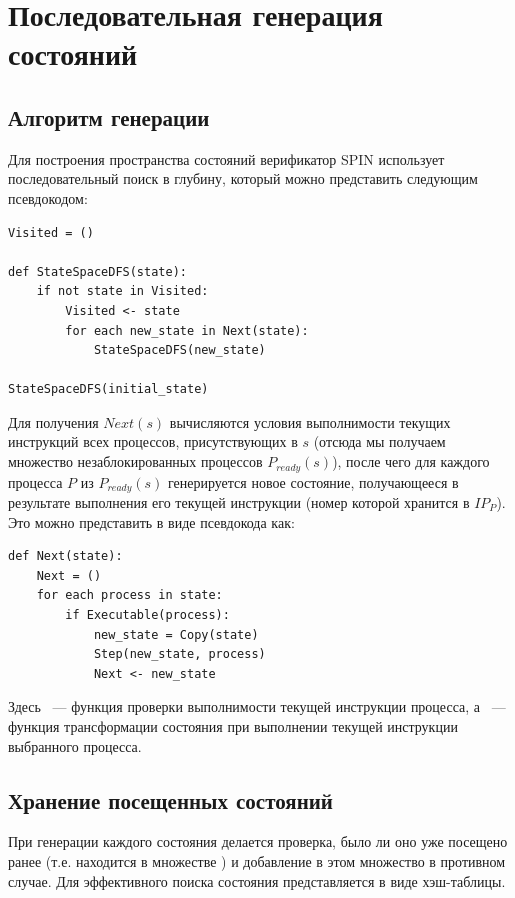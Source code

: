 \chapter{Последовательная генерация состояний}
\label{sec:seq-statespace}

\section{Алгоритм генерации}
\label{sec:seq-algo}

Для построения пространства состояний верификатор SPIN использует последовательный поиск в
глубину, который можно представить следующим псевдокодом:

\begin{lstlisting}[style=pseudocode]
Visited = ()

def StateSpaceDFS(state):
    if not state in Visited:
        Visited <- state
        for each new_state in Next(state):
            StateSpaceDFS(new_state)

StateSpaceDFS(initial_state)
\end{lstlisting}

Для получения $Next(s)$ вычисляются условия выполнимости текущих инструкций всех
процессов, присутствующих в $s$ (отсюда мы получаем множество незаблокированных процессов
$P_{ready}(s)$), после чего для каждого процесса $P$ из $P_{ready}(s)$ генерируется новое
состояние, получающееся в результате выполнения его текущей инструкции (номер которой
хранится в $IP_P$). Это можно представить в виде псевдокода как:

\begin{lstlisting}[style=pseudocode]
def Next(state):
    Next = ()
    for each process in state:
        if Executable(process):
            new_state = Copy(state)
            Step(new_state, process)
            Next <- new_state
\end{lstlisting}

Здесь ~--- функция проверки выполнимости текущей инструкции процесса, а
~--- функция трансформации состояния при выполнении текущей инструкции
выбранного процесса.

\section{Хранение посещенных состояний}
\label{sec:state-hashing}

При генерации каждого состояния делается проверка, было ли оно уже посещено ранее
(т.е. находится в множестве ) и добавление в этом множество в противном
случае. Для эффективного поиска состояния  представляется в виде
хэш-таблицы.

